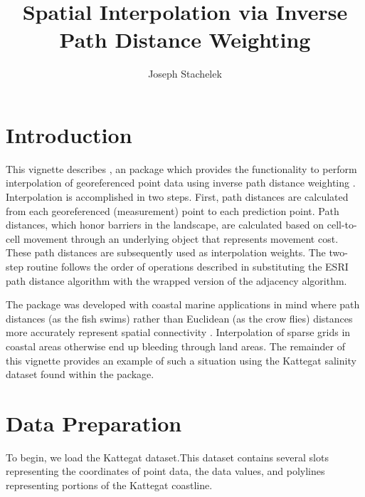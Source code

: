 \documentclass[nojss,shortnames]{jss}
\author{Joseph Stachelek}
\title{Spatial Interpolation via Inverse Path Distance Weighting}
\begin{document}


\section{Introduction}

This vignette describes , an  package which provides the functionality to perform interpolation of georeferenced point data using inverse path distance weighting \citep{suominen2010}. Interpolation is accomplished in two steps. First, path distances are calculated from each georeferenced (measurement) point to each prediction point. Path distances, which honor barriers in the landscape, are calculated based on cell-to-cell movement through an underlying   object \citep{hij2014} that represents movement cost. These path distances are subsequently used as interpolation weights. The two-step routine follows the order of operations described in \citet{suominen2010} substituting the ESRI path distance algorithm \citep{mitchell2012} with the  \citep{etten2014} wrapped version of the  \citep{csardi2006} adjacency algorithm.    

The  package was developed with coastal marine applications in mind where path distances (as the fish swims) rather than Euclidean (as the crow flies) distances more accurately represent spatial connectivity \citep{little1997}. Interpolation of sparse grids in coastal areas otherwise end up bleeding through land areas. The remainder of this vignette provides an example of such a situation using the Kattegat salinity dataset \citep{diggle2006} found within the  package.

\section{Data Preparation}

To begin, we load the Kattegat dataset.This dataset contains several slots representing the coordinates of point data, the data values, and polylines representing portions of the Kattegat coastline.
\newpage
\end{document}
